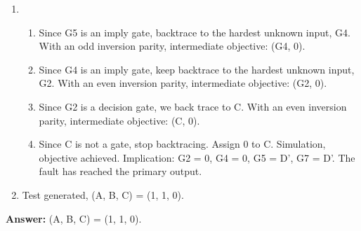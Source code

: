 \begin{enumerate}
{\begin{enumerate}
    \end{enumerate}
  }
  \item {
    \begin{enumerate}
      \item Since G5 is an imply gate, backtrace to the hardest unknown input, G4. With an odd inversion parity, intermediate objective: (G4, 0).
      \item Since G4 is an imply gate, keep backtrace to the hardest unknown input, G2. With an even inversion parity, intermediate objective: (G2, 0).
      \item Since G2 is a decision gate, we back trace to C. With an even inversion parity, intermediate objective: (C, 0).
      \item Since C is not a gate, stop backtracing. Assign 0 to C. Simulation, objective achieved. Implication: G2 = 0, G4 = 0, G5 = D', G7 = D'. The fault has reached the primary output.
    \end{enumerate}
  }
  \item Test generated, (A, B, C) = (1, 1, 0).

\end{enumerate}

\textbf{Answer:} (A, B, C) = (1, 1, 0).

